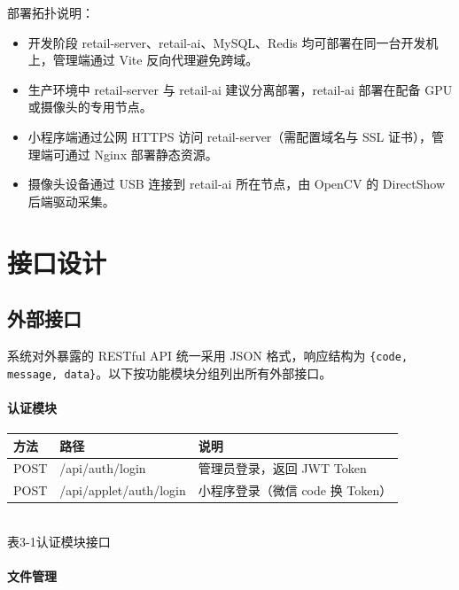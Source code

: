 部署拓扑说明：
\begin{itemize}[leftmargin=2em]
  \item 开发阶段 retail-server、retail-ai、MySQL、Redis 均可部署在同一台开发机上，管理端通过 Vite 反向代理避免跨域。
  \item 生产环境中 retail-server 与 retail-ai 建议分离部署，retail-ai 部署在配备 GPU 或摄像头的专用节点。
  \item 小程序端通过公网 HTTPS 访问 retail-server（需配置域名与 SSL 证书），管理端可通过 Nginx 部署静态资源。
  \item 摄像头设备通过 USB 连接到 retail-ai 所在节点，由 OpenCV 的 DirectShow 后端驱动采集。
\end{itemize}

\section{接口设计}

\subsection{外部接口}

系统对外暴露的 RESTful API 统一采用 JSON 格式，响应结构为 \texttt{\{code, message, data\}}。以下按功能模块分组列出所有外部接口。

\paragraph{认证模块}

\begin{center}
  \renewcommand{\arraystretch}{1.4}
  \begin{tabular}{|>{\centering\arraybackslash}m{1.5cm}|>{\centering\arraybackslash}m{5.2cm}|>{\centering\arraybackslash}m{6.0cm}|}
    \hline
    \textbf{方法} & \textbf{路径}            & \textbf{说明}            \\ \hline
    POST        & /api/auth/login        & 管理员登录，返回 JWT Token     \\ \hline
    POST        & /api/applet/auth/login & 小程序登录（微信 code 换 Token） \\ \hline
  \end{tabular}
  \\[0.3em]
  {表3-1\quad 认证模块接口}
\end{center}

\paragraph{文件管理}

